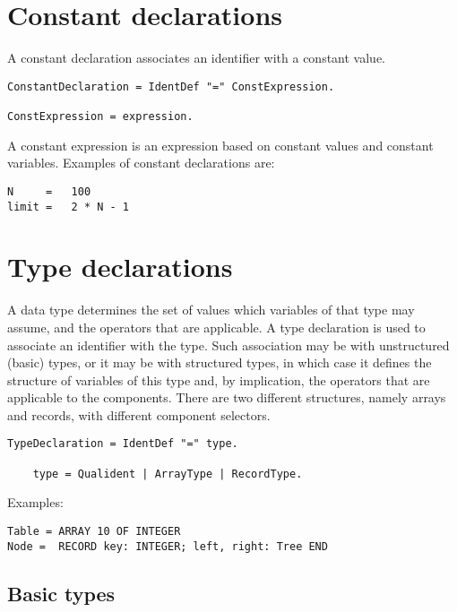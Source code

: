 \documentclass[12pt]{article}
\begin{document}
\section{Constant declarations}

A constant declaration associates an identifier with a constant value.

\begin{lstlisting}[style=ebnf]
ConstantDeclaration = IdentDef "=" ConstExpression. 

ConstExpression = expression.
\end{lstlisting}

A constant expression is an expression based on constant values and constant variables. Examples of constant declarations are:

\begin{lstlisting}[style=example]
N     =   100
limit =   2 * N - 1
\end{lstlisting}

\section{Type declarations}
\label{types}

A data type determines the set of values which variables of that type may assume, and the operators that are applicable. A type declaration is used to associate an identifier with the type. Such association may be with unstructured (basic) types, or it may be with structured types, in which case it defines the structure of variables of this type and, by implication, the operators that are applicable to the components. There are two different structures, namely arrays and records, with different component selectors.

\begin{lstlisting}[style=ebnf]
    TypeDeclaration = IdentDef "=" type.

    type = Qualident | ArrayType | RecordType.
\end{lstlisting}

Examples:

\begin{lstlisting}[style=example]
Table = ARRAY 10 OF INTEGER
Node =  RECORD key: INTEGER; left, right: Tree END
\end{lstlisting}

\subsection{Basic types}
\end{document}
